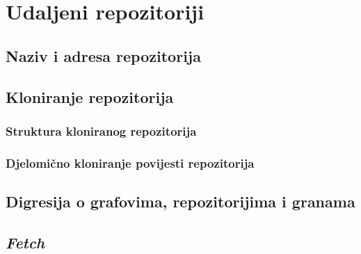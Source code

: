 \chapter*{Udaljeni repozitoriji}

\section*{Naziv i adresa repozitorija}

\section*{Kloniranje repozitorija}



\subsection*{Struktura kloniranog repozitorija}





\subsection*{Djelomično kloniranje povijesti repozitorija}


\section*{Digresija o grafovima, repozitorijima i granama}









\section*{\emph{Fetch}}








